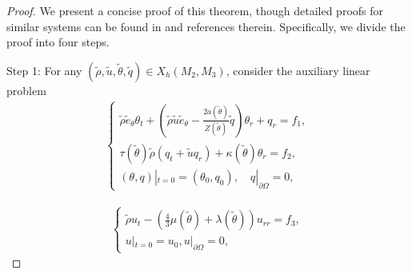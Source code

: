 \documentclass[11pt,reqno]{amsart}
\numberwithin{equation}{section}
\begin{document}
 \begin{proof}
We present a concise proof of this theorem, though detailed proofs for similar systems can be found in \cite{Zheng} and references therein. Specifically, we divide the proof into four steps.

 Step 1: For any $(\tilde \rho, \tilde u, \tilde \theta, \tilde q)\in X_h(M_2, M_3)$, consider the auxiliary linear problem
 \begin{align}\label{loc1}
 \begin{cases}
 \tilde \rho \tilde e_{\theta} \theta_t +(\tilde \rho \tilde u \tilde e_{\theta}-\frac{2 a(\tilde \theta)}{Z(\tilde \theta)} \tilde q) \theta_r+q_r=f_1,\\
 \tau(\tilde \theta)\tilde \rho (q_t+\tilde u q_r)+\kappa(\tilde \theta) \theta_r=f_2,\\
 (\theta, q)|_{t=0}=(\theta_0, q_0),\quad q|_{\partial \Omega}=0,
 \end{cases}
 \end{align}

 \begin{align}\label{loc2}
 \begin{cases}
  \tilde \rho u_t-(\frac{4}{3} \mu(\tilde \theta)+\lambda(\tilde \theta))u_{rr}=f_3,\\
  u|_{t=0}=u_0, u|_{\partial \Omega}=0,
 \end{cases}
 \end{align}


\end{proof}
\end{document}
